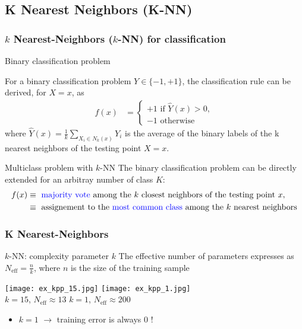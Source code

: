 \subsection{K Nearest Neighbors (K-NN)}

\begin{frame}
  \frametitle{$k$  Nearest-Neighbors ($k$-NN) for classification }


  \begin{block}{Binary classification problem}

  For a binary classification problem $Y\in \{-1,+1\}$,
  the classification rule can be derived, for $X=x$, as
  \begin{align*}
     f(x) &= \begin{cases}
                +1 \textrm{ if } \widehat{Y}(x) > 0,\\
                -1 \textrm{ otherwise}
             \end{cases}
  \end{align*}
  where $\widehat{Y}(x) = \frac{1}{k} \sum_{X_i \in N_k(x) } Y_i$ is the average  of the binary labels of the k nearest neighbors of the testing point $X=x$.
  \end{block}


  \begin{block}{Multiclass problem with $k$-NN}
  The binary classification problem can be directly extended for an arbitray number of class $K$:
  \begin{align*}
   f(x) & \equiv \text{ {\textcolor{blue}{majority vote}} among the $k$ closest neighbors of the testing point $x$},\\
   & \equiv   \text{ assignement to the {\textcolor{blue}{most common class}}  among the $k$ nearest neighbors}
  \end{align*}
  \end{block}


\end{frame}


\begin{frame}
  \frametitle{K Nearest-Neighbors}
\begin{block}{$k$-NN: complexity parameter $k$}
      The effective number of parameters expresses as $N_{\textrm{eff}} = \frac{n}{k}$,
      where $n$ is the size of the training sample
  \end{block}

  \begin{center}
    \texttt{[image: ex\_kpp\_15.jpg]}
  \quad
    \texttt{[image: ex\_kpp\_1.jpg]}\\
    $k=15$, $N_{\textrm{eff}} \approx 13$ \hspace{3cm} $k=1$, $N_{\textrm{eff}} \approx 200$
  \end{center}
  \begin{itemize}
     \item $k=1$ $\rightarrow$ training error is always $0$ !
  \end{itemize}

\end{frame}



